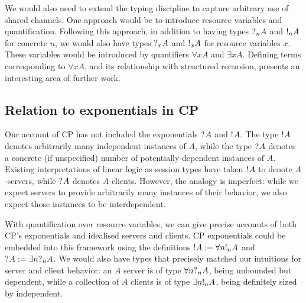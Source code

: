 \documentclass[a4paper,UKenglish]{lipics-v2016}
\begin{document}
We would also need to extend the typing discipline to capture arbitrary use of
shared channels.  One approach would be to introduce resource variables and
quantification.  Following this approach, in addition to having types $\give[n]
A$ and $\take[n] A$ for concrete $n$, we would also have types $\give[x] A$ and
$\take[x] A$ for resource variables $x$.  These variables would be introduced by
quantifiers $\forall x A$ and $\exists x A$.  Defining terms
corresponding to $\forall x A$, and its relationship with structured recursion,
presents an interesting area of further work.


\subsection*{Relation to exponentials in CP}

Our account of CP has not included the exponentials $\give A$ and $\take A$.
The type $\take A$ denotes arbitrarily many independent instances of $A$, while
the type $\give A$ denotes a concrete (if unspecified) number of
potentially-dependent instances of $A$.  Existing interpretations of linear
logic as session types have taken $\take A$ to denote $A$-servers, while
$\give A$ denotes $A$-clients.  However, the analogy is imperfect: while we
expect servers to provide arbitrarily many instances of their behavior, we also
expect those instances to be interdependent.

With quantification over resource variables, we can give precise accounts
of both CP's exponentials and idealised servers and clients.  CP
exponentials could be embedded into this framework using the definitions
$\take{A} := \forall{n}\take[n]{A}$ and $\give{A} := \exists{n}{\give[n]{A}}$.
We would also have types that precisely matched our intuitions for server and
client behavior: an $A$ server is of type $\forall n \give[n] A$, being
unbounded but dependent, while a collection of $A$ clients is of type
$\exists n \take[n] A$, being definitely sized by independent.

\clearpage

\end{document}
